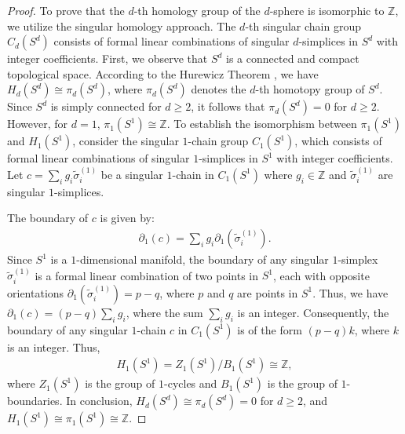 	\begin{proof}
	To prove that the \( d \)-th homology group of the \( d \)-sphere is isomorphic to \(\mathbb{Z}\), we utilize the singular homology approach. The \( d \)-th singular chain group \( C_{d}(S^{d}) \) consists of formal linear combinations of singular \( d \)-simplices in \( S^{d} \) with integer coefficients. First, we observe that \( S^{d} \) is a connected and compact topological space. According to the Hurewicz Theorem \cite[Theorem 4.32]{hatcher2005algebraic}, we have \( H_{d}(S^{d}) \cong \pi_{d}(S^{d}) \), where \( \pi_{d}(S^{d}) \) denotes the \( d \)-th homotopy group of \( S^{d} \). Since \( S^{d} \) is simply connected for \( d \geq 2 \), it follows that \( \pi_{d}(S^{d}) = 0 \) for \( d \geq 2 \). However, for \( d = 1 \), \( \pi_{1}(S^{1}) \cong \mathbb{Z} \). To establish the isomorphism between \( \pi_{1}(S^{1}) \) and \( H_{1}(S^{1}) \), consider the singular \( 1 \)-chain group \( C_{1}(S^{1}) \), which consists of formal linear combinations of singular \( 1 \)-simplices in \( S^{1} \) with integer coefficients. Let \( c = \sum_{i} g_{i} \tilde{\sigma}^{(1)}_{i} \) be a singular \( 1 \)-chain in \( C_{1}(S^{1}) \) where \( g_{i} \in \mathbb{Z} \) and \( \tilde{\sigma}^{(1)}_{i} \) are singular \( 1 \)-simplices.

	The boundary of \( c \) is given by:
	\begin{align}
		\partial_{1}(c) = \sum_{i} g_{i} \partial_{1}(\tilde{\sigma}^{(1)}_{i}). 
	\end{align}
	Since \( S^{1} \) is a \( 1 \)-dimensional manifold, the boundary of any singular \( 1 \)-simplex \( \tilde{\sigma}^{(1)}_{i} \) is a formal linear combination of two points in \( S^{1} \), each with opposite orientations $\partial_{1}(\tilde{\sigma}^{(1)}_{i}) = p - q$, where \( p \) and \( q \) are points in \( S^{1} \). Thus, we have $\partial_{1}(c) = (p - q) \sum_{i} g_{i}$, where the sum \( \sum_{i} g_{i} \) is an integer. Consequently, the boundary of any singular \( 1 \)-chain \( c \) in \( C_{1}(S^{1}) \) is of the form \( (p - q)k \), where \( k \) is an integer. Thus,
	\begin{align}
		H_{1}(S^{1}) = Z_{1}(S^{1}) / B_{1}(S^{1}) \cong \mathbb{Z}, 
	\end{align}
	where \( Z_{1}(S^{1}) \) is the group of \( 1 \)-cycles and \( B_{1}(S^{1}) \) is the group of \( 1 \)-boundaries. In conclusion, \( H_{d}(S^{d}) \cong \pi_{d}(S^{d}) = 0 \) for \( d \geq 2 \), and \( H_{1}(S^{1}) \cong \pi_{1}(S^{1}) \cong \mathbb{Z} \).
\end{proof}

